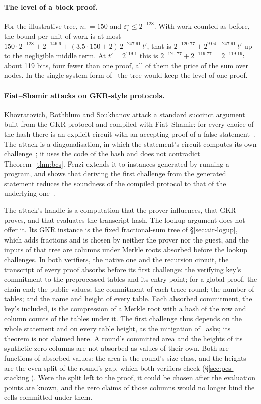 \paragraph{The level of a block proof.} For the illustrative tree, $n_\pi = 150$ and $\varepsilon^\star_i \le 2^{-128}$. With work counted as before, the bound per unit of work is at most $150 \cdot 2^{-128} + 2^{-146.6} + (3.5 \cdot 150 + 2)\, 2^{-247.91}\, t'$, that is $2^{-120.77} + 2^{9.04 - 247.91}\, t'$ up to the negligible middle term. At $t' = 2^{119.1}$ this is $2^{-120.77} + 2^{-119.77} = 2^{-119.19}$: about 119 bits, four fewer than one proof, all of them the price of the sum over nodes. In the single-system form of~\citep{cgsy24} the tree would keep the level of one proof.

\paragraph{Fiat--Shamir attacks on GKR-style protocols.} Khovratovich, Rothblum and Soukhanov attack a standard succinct argument built from the GKR protocol and compiled with Fiat--Shamir: for every choice of the hash there is an explicit circuit with an accepting proof of a false statement~\citep{krs25}. The attack is a diagonalisation, in which the statement's circuit computes its own challenge~\citep{bcg26}; it uses the code of the hash and does not contradict Theorem~\ref{thm:bcs}. Fenzi extends it to instances generated by running a program, and shows that deriving the first challenge from the generated statement reduces the soundness of the compiled protocol to that of the underlying one~\citep{fen26}.

The attack's handle is a computation that the prover influences, that GKR proves, and that evaluates the transcript hash. The lookup argument does not offer it. Its GKR instance is the fixed fractional-sum tree of \S\ref{sec:air-logup}, which adds fractions and is chosen by neither the prover nor the guest, and the inputs of that tree are columns under Merkle roots absorbed before the lookup challenges. In both verifiers, the native one and the recursion circuit, the transcript of every proof absorbs before its first challenge: the verifying key's commitment to the preprocessed tables and its entry point; for a global proof, the chain end; the public values; the commitment of each trace round; the number of tables; and the name and height of every table. Each absorbed commitment, the key's included, is the compression of a Merkle root with a hash of the row and column counts of the tables under it. The first challenge thus depends on the whole statement and on every table height, as the mitigation of~\citep{fen26} asks; its theorem is not claimed here. A round's committed area and the heights of its synthetic zero columns are not absorbed as values of their own. Both are functions of absorbed values: the area is the round's size class, and the heights are the even split of the round's gap, which both verifiers check (\S\ref{sec:pcs-stacking}). Were the split left to the proof, it could be chosen after the evaluation points are known, and the zero claims of those columns would no longer bind the cells committed under them.

